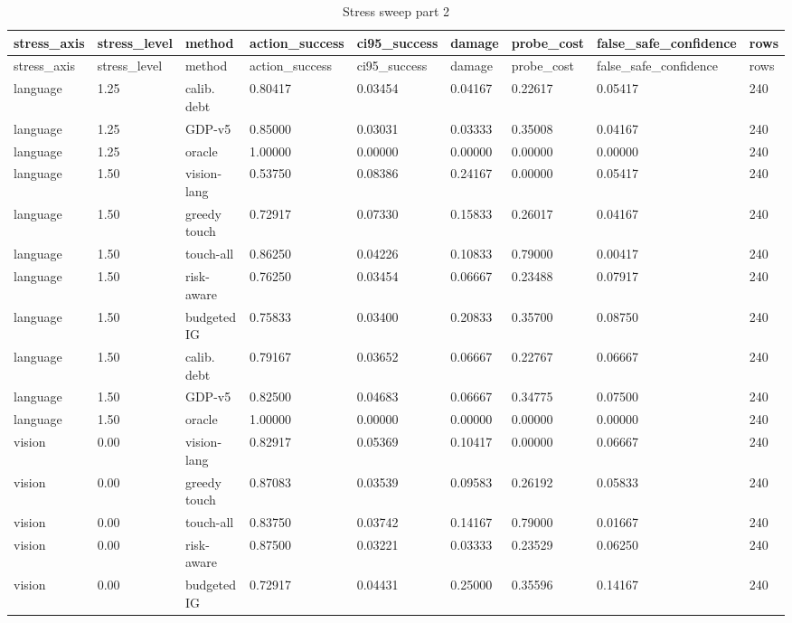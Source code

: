 \documentclass{article}
\begin{document}
\begin{center}
\tiny
\renewcommand{\arraystretch}{0.92}
\setlength{\tabcolsep}{3pt}
\begin{longtable}{lllllllll}
\caption{Stress sweep part 2}\label{tab:stress-sweep-2}\\
\toprule
stress\_axis & stress\_level & method & action\_success & ci95\_success & damage & probe\_cost & false\_safe\_confidence & rows \\
\midrule
\endfirsthead
\toprule
stress\_axis & stress\_level & method & action\_success & ci95\_success & damage & probe\_cost & false\_safe\_confidence & rows \\
\midrule
\endhead
language & 1.25 & calib. debt & 0.80417 & 0.03454 & 0.04167 & 0.22617 & 0.05417 & 240 \\
language & 1.25 & GDP-v5 & 0.85000 & 0.03031 & 0.03333 & 0.35008 & 0.04167 & 240 \\
language & 1.25 & oracle & 1.00000 & 0.00000 & 0.00000 & 0.00000 & 0.00000 & 240 \\
language & 1.50 & vision-lang & 0.53750 & 0.08386 & 0.24167 & 0.00000 & 0.05417 & 240 \\
language & 1.50 & greedy touch & 0.72917 & 0.07330 & 0.15833 & 0.26017 & 0.04167 & 240 \\
language & 1.50 & touch-all & 0.86250 & 0.04226 & 0.10833 & 0.79000 & 0.00417 & 240 \\
language & 1.50 & risk-aware & 0.76250 & 0.03454 & 0.06667 & 0.23488 & 0.07917 & 240 \\
language & 1.50 & budgeted IG & 0.75833 & 0.03400 & 0.20833 & 0.35700 & 0.08750 & 240 \\
language & 1.50 & calib. debt & 0.79167 & 0.03652 & 0.06667 & 0.22767 & 0.06667 & 240 \\
language & 1.50 & GDP-v5 & 0.82500 & 0.04683 & 0.06667 & 0.34775 & 0.07500 & 240 \\
language & 1.50 & oracle & 1.00000 & 0.00000 & 0.00000 & 0.00000 & 0.00000 & 240 \\
vision & 0.00 & vision-lang & 0.82917 & 0.05369 & 0.10417 & 0.00000 & 0.06667 & 240 \\
vision & 0.00 & greedy touch & 0.87083 & 0.03539 & 0.09583 & 0.26192 & 0.05833 & 240 \\
vision & 0.00 & touch-all & 0.83750 & 0.03742 & 0.14167 & 0.79000 & 0.01667 & 240 \\
vision & 0.00 & risk-aware & 0.87500 & 0.03221 & 0.03333 & 0.23529 & 0.06250 & 240 \\
vision & 0.00 & budgeted IG & 0.72917 & 0.04431 & 0.25000 & 0.35596 & 0.14167 & 240 \\

\end{longtable}
\end{center}
\end{document}
